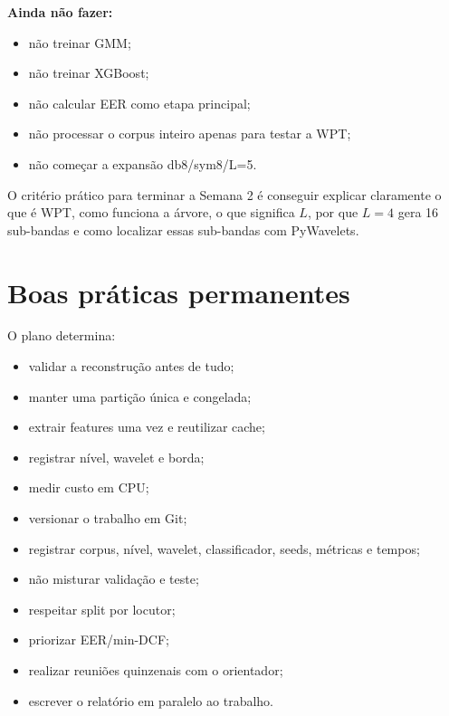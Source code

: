 \documentclass[12pt,a4paper]{article}
\begin{document}
\textbf{Ainda não fazer:}
\begin{itemize}
\item não treinar GMM;
\item não treinar XGBoost;
\item não calcular EER como etapa principal;
\item não processar o corpus inteiro apenas para testar a WPT;
\item não começar a expansão db8/sym8/L=5.
\end{itemize}

O critério prático para terminar a Semana 2 é conseguir explicar claramente o que é WPT, como funciona a árvore, o que significa $L$, por que $L=4$ gera 16 sub-bandas e como localizar essas sub-bandas com PyWavelets.

\section{Boas práticas permanentes}

O plano determina:
\begin{itemize}
\item validar a reconstrução antes de tudo;
\item manter uma partição única e congelada;
\item extrair features uma vez e reutilizar cache;
\item registrar nível, wavelet e borda;
\item medir custo em CPU;
\item versionar o trabalho em Git;
\item registrar corpus, nível, wavelet, classificador, seeds, métricas e tempos;
\item não misturar validação e teste;
\item respeitar split por locutor;
\item priorizar EER/min-DCF;
\item realizar reuniões quinzenais com o orientador;
\item escrever o relatório em paralelo ao trabalho.
\end{itemize}
\end{document}
